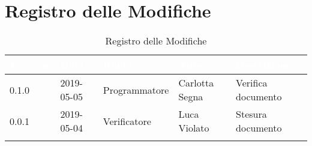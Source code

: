 \newpage

\section*{Registro delle Modifiche}

\begin{center}
\begin{longtable}[c]{|m{}|m{}|m{}|m{}|p{}|}
\hline
\rowcolor{bluelogo}\textbf{\textcolor{white}{Versione}} & \textbf{\textcolor{white}{Data}} & \textbf{\textcolor{white}{Ruolo}} & \textbf{\textcolor{white}{Autore}} & \textbf{\textcolor{white}{Descrizione}}\\
\hline \hline
\endfirsthead
\rowcolor{grigio} 0.1.0 & 2019-05-05 & Programmatore & Carlotta Segna & Verifica documento \\
\hline
0.0.1 & 2019-05-04 & Verificatore & Luca Violato & Stesura documento \\
\hline
\caption{Registro delle Modifiche}
\end{longtable}
\end{center}
